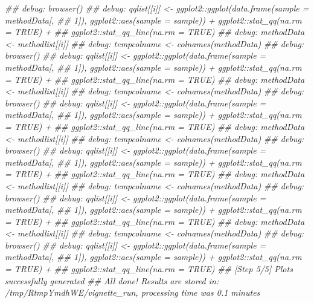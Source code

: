\documentclass[]{article}
\newcommand{\hlcom}[1]{\textcolor[rgb]{0.502,0.502,0.502}{\textit{#1}}}%
\newenvironment{Shaded}{\begin{myshaded}}{\end{myshaded}}
\newcommand{\DocumentationTok}[1]{\hlcom{#1}}
\begin{document}
\begin{Shaded}
\begin{Highlighting}[]
\DocumentationTok{\#\# debug: browser()}
\DocumentationTok{\#\# debug: qqlist[[i]] \textless{}{-} ggplot2::ggplot(data.frame(sample = methodData[, }
\DocumentationTok{\#\#     1]), ggplot2::aes(sample = sample)) + ggplot2::stat\_qq(na.rm = TRUE) + }
\DocumentationTok{\#\#     ggplot2::stat\_qq\_line(na.rm = TRUE)}
\DocumentationTok{\#\# debug: methodData \textless{}{-} methodlist[[i]]}
\DocumentationTok{\#\# debug: tempcolname \textless{}{-} colnames(methodData)}
\DocumentationTok{\#\# debug: browser()}
\DocumentationTok{\#\# debug: qqlist[[i]] \textless{}{-} ggplot2::ggplot(data.frame(sample = methodData[, }
\DocumentationTok{\#\#     1]), ggplot2::aes(sample = sample)) + ggplot2::stat\_qq(na.rm = TRUE) + }
\DocumentationTok{\#\#     ggplot2::stat\_qq\_line(na.rm = TRUE)}
\DocumentationTok{\#\# debug: methodData \textless{}{-} methodlist[[i]]}
\DocumentationTok{\#\# debug: tempcolname \textless{}{-} colnames(methodData)}
\DocumentationTok{\#\# debug: browser()}
\DocumentationTok{\#\# debug: qqlist[[i]] \textless{}{-} ggplot2::ggplot(data.frame(sample = methodData[, }
\DocumentationTok{\#\#     1]), ggplot2::aes(sample = sample)) + ggplot2::stat\_qq(na.rm = TRUE) + }
\DocumentationTok{\#\#     ggplot2::stat\_qq\_line(na.rm = TRUE)}
\DocumentationTok{\#\# debug: methodData \textless{}{-} methodlist[[i]]}
\DocumentationTok{\#\# debug: tempcolname \textless{}{-} colnames(methodData)}
\DocumentationTok{\#\# debug: browser()}
\DocumentationTok{\#\# debug: qqlist[[i]] \textless{}{-} ggplot2::ggplot(data.frame(sample = methodData[, }
\DocumentationTok{\#\#     1]), ggplot2::aes(sample = sample)) + ggplot2::stat\_qq(na.rm = TRUE) + }
\DocumentationTok{\#\#     ggplot2::stat\_qq\_line(na.rm = TRUE)}
\DocumentationTok{\#\# debug: methodData \textless{}{-} methodlist[[i]]}
\DocumentationTok{\#\# debug: tempcolname \textless{}{-} colnames(methodData)}
\DocumentationTok{\#\# debug: browser()}
\DocumentationTok{\#\# debug: qqlist[[i]] \textless{}{-} ggplot2::ggplot(data.frame(sample = methodData[, }
\DocumentationTok{\#\#     1]), ggplot2::aes(sample = sample)) + ggplot2::stat\_qq(na.rm = TRUE) + }
\DocumentationTok{\#\#     ggplot2::stat\_qq\_line(na.rm = TRUE)}
\DocumentationTok{\#\# debug: methodData \textless{}{-} methodlist[[i]]}
\DocumentationTok{\#\# debug: tempcolname \textless{}{-} colnames(methodData)}
\DocumentationTok{\#\# debug: browser()}
\DocumentationTok{\#\# debug: qqlist[[i]] \textless{}{-} ggplot2::ggplot(data.frame(sample = methodData[, }
\DocumentationTok{\#\#     1]), ggplot2::aes(sample = sample)) + ggplot2::stat\_qq(na.rm = TRUE) + }
\DocumentationTok{\#\#     ggplot2::stat\_qq\_line(na.rm = TRUE)}
\DocumentationTok{\#\# [Step 5/5] Plots successfully generated}
\DocumentationTok{\#\# All done! Results are stored in: /tmp/RtmpYmdhWE/vignette\_run, processing time was 0.1 minutes}
\end{Highlighting}
\end{Shaded}
\end{document}
